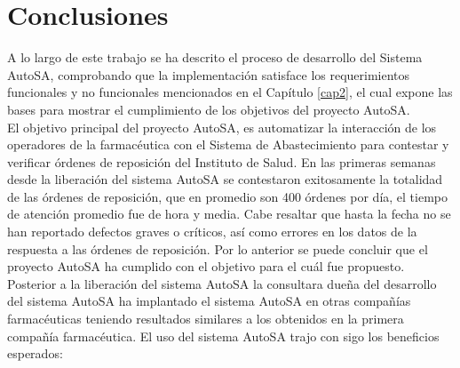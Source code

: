 \chapter{Conclusiones}\label{cap5}

A lo largo de este trabajo se ha descrito el proceso de desarrollo del Sistema AutoSA, comprobando que la implementación satisface los requerimientos funcionales y no funcionales mencionados en el Capítulo \ref{cap2}, el cual expone las bases para mostrar el cumplimiento de los objetivos del proyecto AutoSA.\\
El objetivo principal del proyecto AutoSA, es automatizar la interacción de los operadores de la farmacéutica con el Sistema de Abastecimiento para contestar y verificar órdenes de reposición del Instituto de Salud. En las primeras semanas desde la liberación del sistema AutoSA se contestaron exitosamente la totalidad de las órdenes de reposición, que en promedio son 400 órdenes por día, el tiempo de atención promedio fue de hora y media. Cabe resaltar que hasta la fecha no se han reportado defectos graves o críticos, así como errores en los datos de la respuesta a las órdenes de reposición. Por lo anterior se puede concluir que el proyecto AutoSA ha cumplido con el objetivo para el cuál fue propuesto. Posterior a la liberación del sistema AutoSA la consultara dueña del desarrollo del sistema AutoSA ha implantado el sistema AutoSA en otras compañías farmacéuticas teniendo resultados similares a los obtenidos en la primera compañía farmacéutica. El uso del sistema AutoSA trajo con sigo los beneficios esperados:
